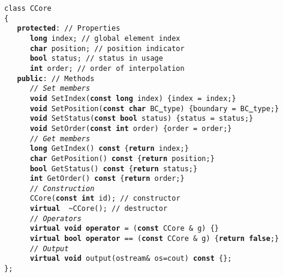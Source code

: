 {
\ttfamily \raggedright \small
\texttt{class\ CCore\\
\{\\
\ \ \ \textbf{protected}: // Properties\\
\ \ \ \ \ \ \textbf{long}\ index; // global element index\\
\ \ \ \ \ \ \textbf{char}\ position; // position indicator\\
\ \ \ \ \ \ \textbf{bool}\ status; //\ status\ in\ usage \\
\ \ \ \ \ \ \textbf{int}\ order; // order of interpolation\\
\ \ \ \textbf{public}: // Methods\\
\ \ \ \ \ \ \textsl{//\ Set\ members}\\
\ \ \ \ \ \ \textbf{void}\ SetIndex(\textbf{const}\ \textbf{long}\ index)\ \{index\ =\ index;\}\\
\ \ \ \ \ \ \textbf{void}\ SetPosition(\textbf{const}\ \textbf{char}\ BC\underline\ type)\ \{boundary\ =\ BC\underline\ type;\}\\
\ \ \ \ \ \ \textbf{void}\ SetStatus(\textbf{const}\ \textbf{bool}\ status)\ \{status\ =\ status;\}\\
\ \ \ \ \ \ \textbf{void}\ SetOrder(\textbf{const}\ \textbf{int}\ order)\ \{order\ =\ order;\}\\
\ \ \ \ \ \ \textsl{//\ Get\ members}\\
\ \ \ \ \ \ \textbf{long}\ GetIndex()\ \textbf{const}\ \{\textbf{return}\ index;\}\ \\
\ \ \ \ \ \ \textbf{char}\ GetPosition()\ \textbf{const}\ \{\textbf{return}\ position;\}\ \\
\ \ \ \ \ \ \textbf{bool}\ GetStatus()\ \textbf{const}\ \{\textbf{return}\ status;\}\\
\ \ \ \ \ \ \textbf{int}\  GetOrder()\ \textbf{const}\ \{\textbf{return}\ order;\}\\
\ \ \ \ \ \ \textsl{//\ Construction}\\
\ \ \ \ \ \ CCore(\textbf{const}\ \textbf{int}\ id); // constructor\\
\ \ \ \ \ \ \textbf{virtual}\ \ \textasciitilde CCore(); // destructor\\
\ \ \ \ \ \ \textsl{//\ Operators}\\
\ \ \ \ \ \ \textbf{virtual}\ \textbf{void}\ \textbf{operator}\ =\ (\textbf{const}\ CCore\ \&\ g)\ \{\}\\
\ \ \ \ \ \ \textbf{virtual}\ \textbf{bool}\ \textbf{operator}\ ==\ (\textbf{const}\ CCore\ \&\ g)\ \{\textbf{return}\ \textbf{false};\}\\
\ \ \ \ \ \ \textsl{//\ Output}\\
\ \ \ \ \ \ \textbf{virtual}\ \textbf{void}\ output(ostream\&\ os=cout)\ \textbf{const}\ \{\};\\
\};\\
}
}
\normalfont\normalsize
